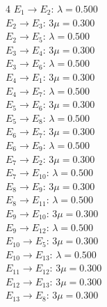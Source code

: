 \begin{multicols}{4}\footnotesize
$E_{1}\to E_{2}$: $\lambda=0.500$\\$E_{2}\to E_{3}$: $3\mu=0.300$\\$E_{2}\to E_{5}$: $\lambda=0.500$\\$E_{3}\to E_{4}$: $3\mu=0.300$\\$E_{3}\to E_{6}$: $\lambda=0.500$\\$E_{4}\to E_{1}$: $3\mu=0.300$\\$E_{4}\to E_{7}$: $\lambda=0.500$\\$E_{5}\to E_{6}$: $3\mu=0.300$\\$E_{5}\to E_{8}$: $\lambda=0.500$\\$E_{6}\to E_{7}$: $3\mu=0.300$\\$E_{6}\to E_{9}$: $\lambda=0.500$\\$E_{7}\to E_{2}$: $3\mu=0.300$\\$E_{7}\to E_{10}$: $\lambda=0.500$\\$E_{8}\to E_{9}$: $3\mu=0.300$\\$E_{8}\to E_{11}$: $\lambda=0.500$\\$E_{9}\to E_{10}$: $3\mu=0.300$\\$E_{9}\to E_{12}$: $\lambda=0.500$\\$E_{10}\to E_{5}$: $3\mu=0.300$\\$E_{10}\to E_{13}$: $\lambda=0.500$\\$E_{11}\to E_{12}$: $3\mu=0.300$\\$E_{12}\to E_{13}$: $3\mu=0.300$\\$E_{13}\to E_{8}$: $3\mu=0.300$
\end{multicols}